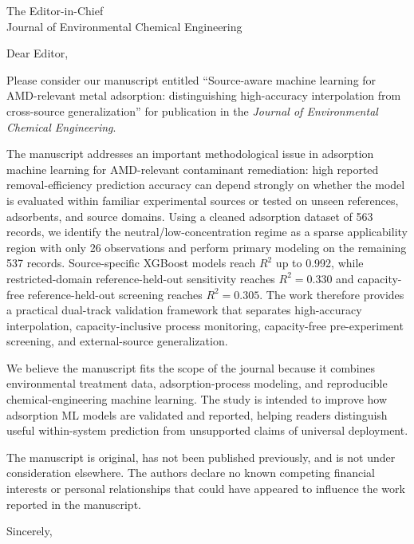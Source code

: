 \documentclass[12pt]{letter}
\begin{document}
\begin{letter}{The Editor-in-Chief\\Journal of Environmental Chemical Engineering}

\opening{Dear Editor,}

Please consider our manuscript entitled ``Source-aware machine learning for AMD-relevant metal adsorption: distinguishing high-accuracy interpolation from cross-source generalization'' for publication in the \textit{Journal of Environmental Chemical Engineering}.

The manuscript addresses an important methodological issue in adsorption machine learning for AMD-relevant contaminant remediation: high reported removal-efficiency prediction accuracy can depend strongly on whether the model is evaluated within familiar experimental sources or tested on unseen references, adsorbents, and source domains. Using a cleaned adsorption dataset of 563 records, we identify the neutral/low-concentration regime as a sparse applicability region with only 26 observations and perform primary modeling on the remaining 537 records. Source-specific XGBoost models reach $R^2$ up to 0.992, while restricted-domain reference-held-out sensitivity reaches $R^2 = 0.330$ and capacity-free reference-held-out screening reaches $R^2 = 0.305$. The work therefore provides a practical dual-track validation framework that separates high-accuracy interpolation, capacity-inclusive process monitoring, capacity-free pre-experiment screening, and external-source generalization.

We believe the manuscript fits the scope of the journal because it combines environmental treatment data, adsorption-process modeling, and reproducible chemical-engineering machine learning. The study is intended to improve how adsorption ML models are validated and reported, helping readers distinguish useful within-system prediction from unsupported claims of universal deployment.

The manuscript is original, has not been published previously, and is not under consideration elsewhere. The authors declare no known competing financial interests or personal relationships that could have appeared to influence the work reported in the manuscript.

\closing{Sincerely,}

\end{letter}
\end{document}
